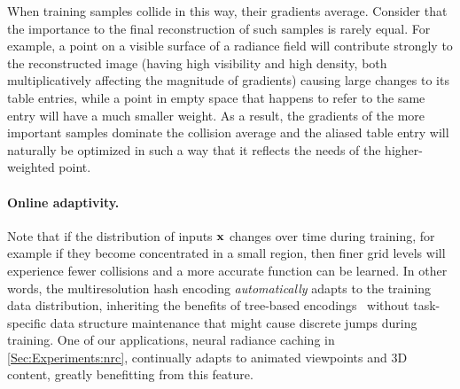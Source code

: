 \documentclass[acmtog,authorversion]{acmart}
\begin{document}
When training samples collide in this way, their gradients average.
Consider that the importance to the final reconstruction of such samples is rarely equal.
For example, a point on a visible surface of a radiance field will contribute strongly to the reconstructed image (having high visibility and high density, both multiplicatively affecting the magnitude of gradients) causing large changes to its table entries, while a point in empty space that happens to refer to the same entry will have a much smaller weight.
As a result, the gradients of the more important samples dominate the collision average and the aliased table entry will naturally be optimized in such a way that it reflects the needs of the higher-weighted point.


\paragraph{Online adaptivity.}
Note that if the distribution of inputs $\mathbf{x}$ changes over time during training, for example if they become concentrated in a small region, then finer grid levels will experience fewer collisions and a more accurate function can be learned.
In other words, the multiresolution hash encoding \emph{automatically} adapts to the training data distribution, inheriting the benefits of tree-based encodings~\cite{takikawa2021nglod} without task-specific data structure maintenance that might cause discrete jumps during training.
One of our applications, neural radiance caching in \autoref{Sec:Experiments:nrc}, continually adapts to animated viewpoints and 3D content, greatly benefitting from this feature.
\end{document}
